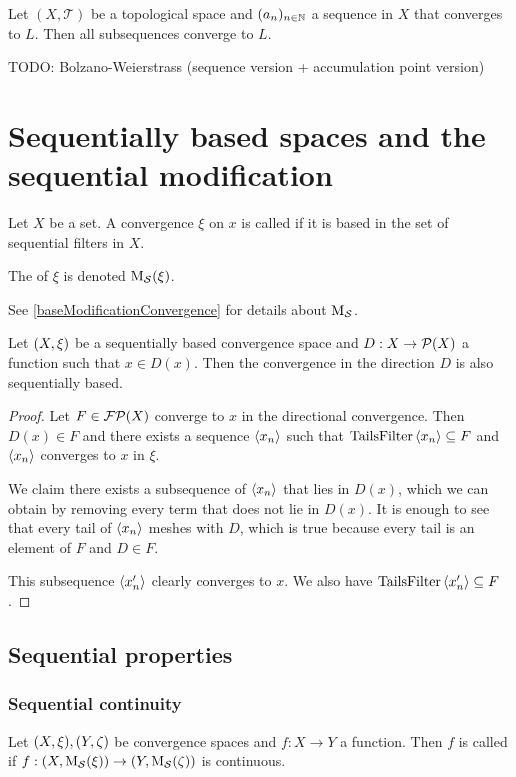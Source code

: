 \begin{lemma} \label{subsequencesConverge}
Let $(X,\mathcal{T})$ be a topological space and $(a_n)_{n\in\mathbb{N}}$ a sequence in $X$ that converges to $L$. Then all subsequences converge to $L$.
\end{lemma}

TODO: Bolzano-Weierstrass (sequence version + accumulation point version)

\section{Sequentially based spaces and the sequential modification}
\begin{definition}
Let $X$ be a set. A convergence $\xi$  on $x$ is called  if it is based in the set of sequential filters in $X$.

The  of $\xi$ is denoted $\operatorname{M_\mathcal{S}}(\xi)$.
\end{definition}
See \ref{baseModificationConvergence} for details about $\operatorname{M_\mathcal{S}}$.

\begin{lemma}
Let $\sSet{X, \xi}$ be a sequentially based convergence space and $D:X\to \operatorname{\mathcal{P}}(X)$ a function such that $x\in D(x)$. Then the convergence in the direction $D$ is also sequentially based.
\end{lemma}
\begin{proof}
Let $F\in \operatorname{\mathcal{FP}}(X)$ converge to $x$ in the directional convergence. Then $D(x)\in F$ and there exists a sequence $\left\langle x_n \right\rangle$ such that $\operatorname{TailsFilter}\left\langle x_n \right\rangle\subseteq F$ and $\left\langle x_n \right\rangle$ converges to $x$ in $\xi$.

We claim there exists a subsequence of $\left\langle x_n \right\rangle$ that lies in $D(x)$, which we can obtain by removing every term that does not lie in $D(x)$. It is enough to see that every tail of $\left\langle x_n \right\rangle$ meshes with $D$, which is true because every tail is an element of $F$ and $D\in F$.

This subsequence $\left\langle x'_n \right\rangle$ clearly converges to $x$. We also have $\operatorname{TailsFilter}\left\langle x_n' \right\rangle\subseteq F$.
\end{proof}

\subsection{Sequential properties}
\subsubsection{Sequential continuity}
\begin{definition}
Let $\sSet{X,\xi}, \sSet{Y,\zeta}$ be convergence spaces and $f:X\to Y$ a function. Then $f$ is called  if $f: \sSet{X, \seqMod(\xi)} \to \sSet{Y, \seqMod(\zeta)}$ is continuous.
\end{definition}

